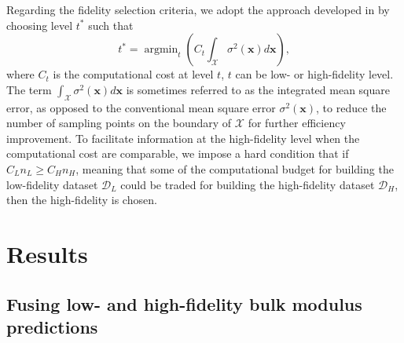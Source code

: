 \documentclass[%
 reprint,
aip,jcp
]{revtex4-1}
\DeclareMathOperator*{\argmin}{argmin}
\begin{document}
Regarding the fidelity selection criteria, we adopt the approach developed in \cite{tran2020smfbo2cogp} by choosing level $t^*$ such that
\begin{equation}
t^* = \argmin_t \left( C_t \int_\mathcal{X}\sigma^2(\bm{x}) d\bm{x} \right),
\end{equation}
where $C_t$ is the computational cost at level $t$, $t$ can be low- or high-fidelity level. 
The term $\int_\mathcal{X}\sigma^2(\bm{x}) d\bm{x}$ is sometimes referred to as the integrated mean square error, as opposed to the conventional mean square error $\sigma^2(\bm{x})$, to reduce the number of sampling points on the boundary of $\mathcal{X}$ for further efficiency improvement. 
To facilitate information at the high-fidelity level when the computational cost are comparable, we impose a hard condition that if $C_L n_L \geq C_H n_H$, meaning that some of the computational budget for building the low-fidelity dataset $\mathcal{D}_L$ could be traded for building the high-fidelity dataset $\mathcal{D}_H$, then the high-fidelity is chosen. 



\section{Results}
\label{sec:Results}



\subsection{Fusing low- and high-fidelity bulk modulus predictions}

\end{document}
